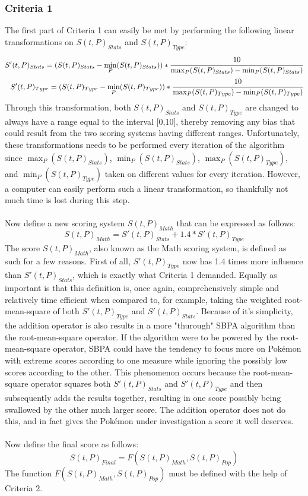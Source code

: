 \documentclass{article}
\begin{document}
\subsubsection{Criteria 1}
The first part of Criteria 1 can easily be met by performing the following linear transformations on $S(t,P)_{Stats}$ and $S(t,P)_{Type}$:
\begin{eqnarray*}
	S'(t,P)_{Stats}=(S(t,P)_{Stats}-\min_P(S(t,P)_{Stats}))*\cfrac{10}{\max_P(S(t,P)_{Stats})-\min_P(S(t,P)_{Stats})}\\
	S'(t,P)_{Type}=(S(t,P)_{Type}-\min_P(S(t,P)_{Type}))*\cfrac{10}{\max_P(S(t,P)_{Type})-\min_P(S(t,P)_{Type})}
\end{eqnarray*}
Through this transformation, both $S(t,P)_{Stats}$ and $S(t,P)_{Type}$ are changed to always have a range equal to the interval [0,10], thereby removing any bias that could result from the two scoring systems having different ranges. Unfortunately, these transformations needs to be performed every iteration of the algorithm since $\max_P(S(t,P)_{Stats})$, $\min_P(S(t,P)_{Stats})$, $\max_P(S(t,P)_{Type})$, and $\min_P(S(t,P)_{Type})$ taken on different values for every iteration. However, a computer can easily perform such a linear transformation, so thankfully not much time is lost during this step.\\\\
Now define a new scoring system $S(t,P)_{Math}$ that can be expressed as follows:
\begin{equation*}
	S(t,P)_{Math}=S'(t,P)_{Stats}+1.4*S'(t,P)_{Type}
\end{equation*}
The score $S(t,P)_{Math}$, also known as the Math scoring system, is defined as such for a few reasons. First of all, $S'(t,P)_{Type}$ now has 1.4 times more influence than $S'(t,P)_{Stats}$, which is exactly what Criteria 1 demanded. Equally as important is that this definition is, once again, comprehensively simple and relatively time efficient when compared to, for example, taking the weighted root-mean-square of both $S'(t,P)_{Type}$ and $S'(t,P)_{Stats}$. Because of it's simplicity, the addition operator is also results in a more "thurough" SBPA algorithm than the root-mean-square operator. If the algorithm were to be powered by the root-mean-square operator, SBPA could have the tendency to focus more on Pok\'emon with extreme scores according to one measure while ignoring the possibly low scores according to the other. This phenomenon occurs because the root-mean-square operator squares both $S'(t,P)_{Stats}$ and $S'(t,P)_{Type}$ and then subsequently adds the results together, resulting in one score possibly being swallowed by the other much larger score. The addition operator does not do this, and in fact gives the Pok\'emon under investigation a score it well deserves.\\\\
Now define the final score as follows:
\begin{equation*}
	S(t,P)_{Final}=F(S(t,P)_{Math},S(t,P)_{Pop})
\end{equation*}
The function $F(S(t,P)_{Math},S(t,P)_{Pop})$ must be defined with the help of Criteria 2.
\end{document}
